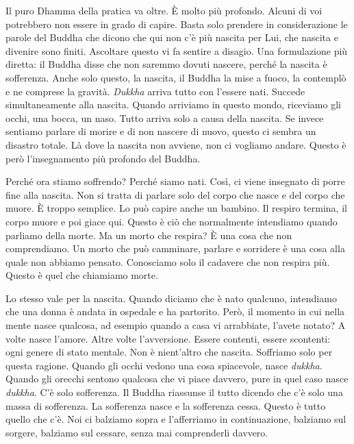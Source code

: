 Il puro Dhamma della pratica va oltre. È molto più profondo. Alcuni di
voi potrebbero non essere in grado di capire. Basta solo prendere in
considerazione le parole del Buddha che dicono che qui non c'è più
nascita per Lui, che nascita e divenire sono finiti. Ascoltare questo vi
fa sentire a disagio. Una formulazione più diretta: il Buddha disse che
non saremmo dovuti nascere, perché la nascita è sofferenza. Anche solo
questo, la nascita, il Buddha la mise a fuoco, la contemplò e ne
comprese la gravità. \emph{Dukkha} arriva tutto con l'essere nati.
Succede simultaneamente alla nascita. Quando arriviamo in questo mondo,
riceviamo gli occhi, una bocca, un naso. Tutto arriva solo a causa della
nascita. Se invece sentiamo parlare di morire e di non nascere di nuovo,
questo ci sembra un disastro totale. Là dove la nascita non avviene, non
ci vogliamo andare. Questo è però l'insegnamento più profondo del
Buddha.

Perché ora stiamo soffrendo? Perché siamo nati. Così, ci viene insegnato
di porre fine alla nascita. Non si tratta di parlare solo del corpo che
nasce e del corpo che muore. È troppo semplice. Lo può capire anche un
bambino. Il respiro termina, il corpo muore e poi giace qui. Questo è
ciò che normalmente intendiamo quando parliamo della morte. Ma un morto
che respira? È una cosa che non comprendiamo. Un morto che può
camminare, parlare e sorridere è una cosa alla quale non abbiamo
pensato. Conosciamo solo il cadavere che non respira più. Questo è quel
che chiamiamo morte.

Lo stesso vale per la nascita. Quando diciamo che è nato qualcuno,
intendiamo che una donna è andata in ospedale e ha partorito. Però, il
momento in cui nella mente nasce qualcosa, ad esempio quando a casa vi
arrabbiate, l'avete notato? A volte nasce l'amore. Altre volte
l'avversione. Essere contenti, essere scontenti: ogni genere di stato
mentale. Non è nient'altro che nascita. Soffriamo solo per questa
ragione. Quando gli occhi vedono una cosa spiacevole, nasce
\emph{dukkha}. Quando gli orecchi sentono qualcosa che vi piace davvero,
pure in quel caso nasce \emph{dukkha}. C'è solo sofferenza. Il Buddha
riassunse il tutto dicendo che c'è solo una massa di sofferenza. La
sofferenza nasce e la sofferenza cessa. Questo è tutto quello che c'è.
Noi ci balziamo sopra e l'afferriamo in continuazione, balziamo sul
sorgere, balziamo sul cessare, senza mai comprenderli davvero.

